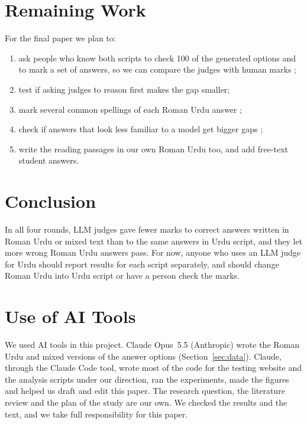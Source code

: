 \documentclass[conference]{IEEEtran}
\begin{document}
\section{Remaining Work}
\label{sec:remaining}
For the final paper we plan to:
\begin{enumerate}
\item ask people who know both scripts to check 100 of the generated options and to mark a set of answers, so we can
compare the judges with human marks \cite{hada2024large};
\item test if asking judges to reason first makes the gap smaller;
\item mark several common spellings of each Roman Urdu answer \cite{khan2022clustering};
\item check if answers that look less familiar to a model get bigger gaps \cite{wataoka2024self};
\item write the reading passages in our own Roman Urdu too, and add free-text student answers.
\end{enumerate}

\section{Conclusion}
In all four rounds, LLM judges gave fewer marks to correct answers written in Roman Urdu or mixed text than to the same
answers in Urdu script, and they let more wrong Roman Urdu answers pass. For now, anyone who uses an LLM judge for Urdu should report results for each script separately, and should
change Roman Urdu into Urdu script or have a person check the marks.

\section*{Use of AI Tools}
We used AI tools in this project. Claude Opus~5.5 (Anthropic) wrote the Roman Urdu and mixed versions of the answer
options (Section~\ref{sec:data}). Claude, through the Claude Code tool, wrote most of the code for the testing website and
the analysis scripts under our direction, ran the experiments, made the figures and helped us draft and edit this paper.
The research question, the literature review and the plan of the study are our own. We checked the results and the text,
and we take full responsibility for this paper.



\end{document}
